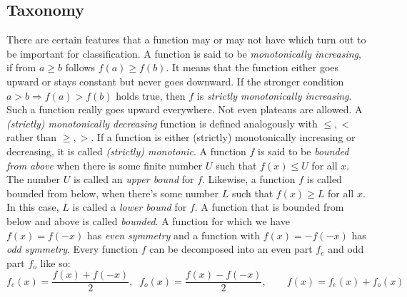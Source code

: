


\subsection{Taxonomy}
There are certain features that a function may or may not have which turn out to be important for classification. A function is said to be \emph{monotonically increasing}, if from $a \geq b$ follows $f(a) \geq f(b)$. It means that the function either goes upward or stays constant but never goes downward. If the stronger condition  $a > b \Rightarrow f(a) > f(b)$ holds true, then $f$ is \emph{strictly monotonically increasing}. Such a function really goes upward everywhere. Not even plateaus are allowed. A \emph{(strictly) monotonically decreasing} function is defined analogously with $\leq, <$ rather than $\geq, >$. If a function is either (strictly) monotonically increasing or decreasing, it is called \emph{(strictly) monotonic}. A function $f$ is said to be \emph{bounded from above} when there is some finite number $U$ such that $f(x) \leq U$ for all $x$. The number $U$ is called an \emph{upper bound} for $f$. Likewise, a function $f$ is called bounded from below, when there's some number $L$ such that $f(x) \geq L$ for all $x$. In this case, $L$ is called a \emph{lower bound} for $f$. A function that is bounded from below and above is called \emph{bounded}. A function for which we have $f(x) = f(-x)$ has \emph{even symmetry} and a function with $f(x) = -f(-x)$ has \emph{odd symmetry}. Every function $f$ can be decomposed into an even part $f_e$ and odd part $f_o$ like so: 
\begin{equation}
\label{Eq:EvenOddFuncDecomp}
f_e(x) = \frac{f(x) + f(-x)}{2}, \;\;
f_o(x) = \frac{f(x) - f(-x)}{2}, \qquad
f(x) = f_e(x) + f_o(x)
\end{equation}
